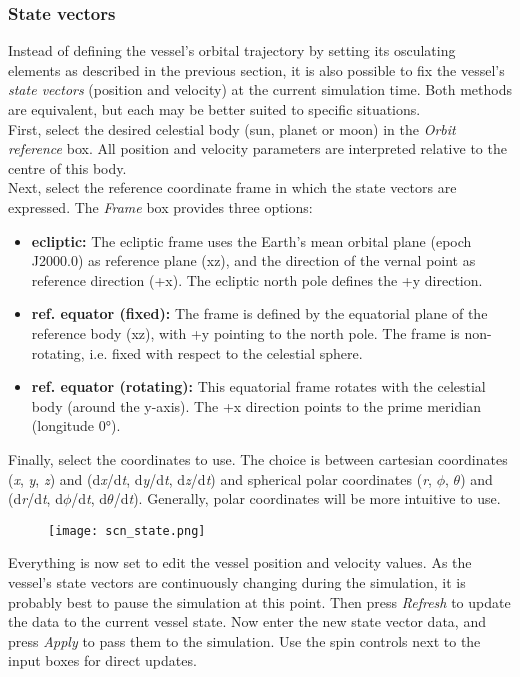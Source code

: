 \documentclass[Orbiter User Manual.tex]{subfiles}
\begin{document}
\subsubsection{State vectors}
Instead of defining the vessel's orbital trajectory by setting its osculating elements as described in the previous section, it is also possible to fix the vessel's \textit{state vectors} (position and velocity) at the current simulation time. Both methods are equivalent, but each may be better suited to specific situations.\\
First, select the desired celestial body (sun, planet or moon) in the \textit{Orbit reference} box. All position and velocity parameters are interpreted relative to the centre of this body.\\
Next, select the reference coordinate frame in which the state vectors are expressed. The \textit{Frame} box provides three options:

\begin{itemize}
\item \textbf{ecliptic:} The ecliptic frame uses the Earth's mean orbital plane (epoch J2000.0) as reference plane (xz), and the direction of the vernal point as reference direction (+x). The ecliptic north pole defines the +y direction.
\item \textbf{ref. equator (fixed):} The frame is defined by the equatorial plane of the reference body (xz), with +y pointing to the north pole. The frame is non-rotating, i.e. fixed with respect to the celestial sphere.
\item \textbf{ref. equator (rotating):} This equatorial frame rotates with the celestial body (around the y-axis). The +x direction points to the prime meridian (longitude 0°).
\end{itemize}

\noindent
Finally, select the coordinates to use. The choice is between cartesian coordinates (\textit{x}, \textit{y}, \textit{z}) and (d\textit{x}/d\textit{t}, d\textit{y}/d\textit{t}, d\textit{z}/d\textit{t}) and spherical polar coordinates (\textit{r}, $\phi$, $\theta$) and (d\textit{r}/d\textit{t}, d$\phi$/d\textit{t}, d$\theta$/d\textit{t}). Generally, polar coordinates will be more intuitive to use.

\begin{figure}[H]
	\centering
	\texttt{[image: scn\_state.png]}
\end{figure}

\noindent
Everything is now set to edit the vessel position and velocity values. As the vessel's state vectors are continuously changing during the simulation, it is probably best to pause the simulation at this point. Then press \textit{Refresh} to update the data to the current vessel state. Now enter the new state vector data, and press \textit{Apply} to pass them to the simulation. Use the spin controls next to the input boxes for direct updates.
\end{document}

